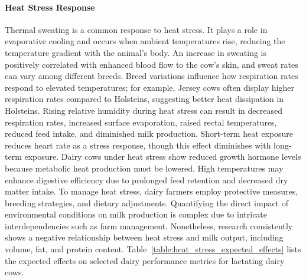 \paragraph{Heat Stress Response}
Thermal sweating is a common response to heat stress. It plays a role in evaporative cooling and occurs when ambient temperatures rise, reducing the temperature gradient with the animal's body. An increase in sweating is positively correlated with enhanced blood flow to the cow’s skin, and sweat rates can vary among different breeds. Breed variations influence how respiration rates respond to elevated temperatures; for example, Jersey cows often display higher respiration rates compared to Holsteins, suggesting better heat dissipation in Holsteins. Rising relative humidity during heat stress can result in decreased respiration rates, increased surface evaporation, raised rectal temperatures, reduced feed intake, and diminished milk production. Short-term heat exposure reduces heart rate as a stress response, though this effect diminishes with long-term exposure. Dairy cows under heat stress show reduced growth hormone levels because metabolic heat production must be lowered. High temperatures may enhance digestive efficiency due to prolonged feed retention and decreased dry matter intake. To manage heat stress, dairy farmers employ protective measures, breeding strategies, and dietary adjustments. Quantifying the direct impact of environmental conditions on milk production is complex due to intricate interdependencies such as farm management. Nonetheless, research consistently shows a negative relationship between heat stress and milk output, including volume, fat, and protein content. Table~\ref{table:heat_stress_expected_effects} lists the expected effects on selected dairy performance metrics for lactating dairy cows.

